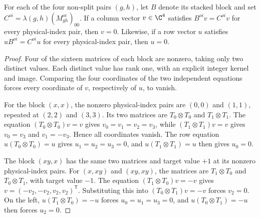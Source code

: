 \begin{lemma}%
    \label{thm:asymex_z2z2_no_intertwiner}
    \leanok
    For each of the four non-split pairs $(g,h)$, let $B$ denote its
    stacked block and set $C^{oi}=\lambda(g,h)(M_{gh}^{oi})_{00}$.
    If a column vector $v\in\C^4$ satisfies $B^{oi}v=C^{oi}v$ for
    every physical-index pair, then $v=0$.
    Likewise, if a row vector $u$ satisfies $uB^{oi}=C^{oi}u$ for
    every physical-index pair, then $u=0$.
\end{lemma}

\begin{proof}
    \leanok
    Four of the sixteen matrices of each block are nonzero, taking
    only two distinct values. Each distinct value has rank one, with
    an explicit integer kernel and image.
    Comparing the four coordinates of the two independent equations
    forces every coordinate of $v$, respectively of $u$, to vanish.

    For the block $(x,x)$, the nonzero physical-index pairs are
    $(0,0)$ and $(1,1)$, repeated at $(2,2)$ and $(3,3)$.
    Its two matrices are $T_0\otimes T_0$ and $T_1\otimes T_1$.
    The equation $(T_0\otimes T_0)v=v$ gives
    $v_0=v_1=v_2=v_3$, while $(T_1\otimes T_1)v=v$ gives
    $v_0=v_3$ and $v_1=-v_3$. Hence all coordinates vanish.
    The row equation $u(T_0\otimes T_0)=u$ gives
    $u_1=u_2=u_3=0$, and $u(T_1\otimes T_1)=u$ then gives $u_0=0$.

    The block $(xy,x)$ has the same two matrices and target value
    $+1$ at its nonzero physical-index pairs.
    For $(x,xy)$ and $(xy,xy)$, the matrices are
    $T_1\otimes T_0$ and $T_0\otimes T_1$, with target value $-1$.
    The equation $(T_1\otimes T_0)v=-v$ gives
    $v=(-v_2,-v_2,v_2,v_2)^{\mathsf T}$.
    Substituting this into $(T_0\otimes T_1)v=-v$ forces $v_2=0$.
    On the left, $u(T_1\otimes T_0)=-u$ forces
    $u_0=u_1=u_3=0$, and $u(T_0\otimes T_1)=-u$ then forces
    $u_2=0$.
\end{proof}


